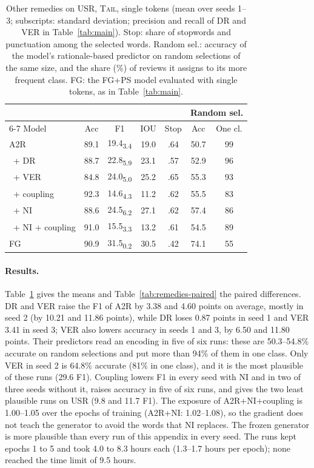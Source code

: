\documentclass[11pt]{article}
\newcommand{\TAIL}{\textup{\textsc{Tail}}}
\begin{document}
\begin{table}[h]
\centering
\small
\setlength{\tabcolsep}{3.5pt}
\begin{tabular}{@{}lcccccc@{}}
\toprule
& & & & & \multicolumn{2}{c}{Random sel.} \\
\cmidrule(l){6-7}
Model & Acc & F1 & IOU & Stop & Acc & One cl. \\
\midrule
A2R & 89.1 & 19.4\textsubscript{3.4} & 19.0 & .64 & 50.7 & 99 \\
\ + DR & 88.7 & 22.8\textsubscript{5.9} & 23.1 & .57 & 52.9 & 96 \\
\ + VER & 84.8 & 24.0\textsubscript{5.0} & 25.2 & .65 & 55.3 & 93 \\
\ + coupling & 92.3 & 14.6\textsubscript{4.3} & 11.2 & .62 & 55.5 & 83 \\
\ + NI & 88.6 & 24.5\textsubscript{6.2} & 27.1 & .62 & 57.4 & 86 \\
\ + NI + coupling & 91.0 & 15.5\textsubscript{3.3} & 13.2 & .61 & 54.5 & 89 \\
FG & 90.9 & 31.5\textsubscript{0.2} & 30.5 & .42 & 74.1 & 55 \\
\bottomrule
\end{tabular}
\caption{Other remedies on USR, \TAIL, single tokens (mean over seeds 1--3; subscripts: standard deviation; precision and recall of DR and VER in Table~\ref{tab:main}). Stop: share of stopwords and punctuation among the selected words. Random sel.: accuracy of the model's rationale-based predictor on random selections of the same size, and the share (\%) of reviews it assigns to its more frequent class. FG: the FG+PS model evaluated with single tokens, as in Table~\ref{tab:main}.}
\label{tab:remedies}
\end{table}

\paragraph{Results.} Table~\ref{tab:remedies} gives the means and Table~\ref{tab:remedies-paired} the paired differences. DR and VER raise the F1 of A2R by 3.38 and 4.60 points on average, mostly in seed 2 (by 10.21 and 11.86 points), while DR loses 0.87 points in seed 1 and VER 3.41 in seed 3; VER also lowers accuracy in seeds 1 and 3, by 6.50 and 11.80 points. Their predictors read an encoding in five of six runs: these are 50.3--54.8\% accurate on random selections and put more than 94\% of them in one class. Only VER in seed 2 is 64.8\% accurate (81\% in one class), and it is the most plausible of these runs (29.6 F1). Coupling lowers F1 in every seed with NI and in two of three seeds without it, raises accuracy in five of six runs, and gives the two least plausible runs on USR (9.8 and 11.7 F1). The exposure of A2R+NI+coupling is 1.00--1.05 over the epochs of training (A2R+NI: 1.02--1.08), so the gradient does not teach the generator to avoid the words that NI replaces. The frozen generator is more plausible than every run of this appendix in every seed. The runs kept epochs 1 to 5 and took 4.0 to 8.3 hours each (1.3--1.7 hours per epoch); none reached the time limit of 9.5 hours.
\end{document}
